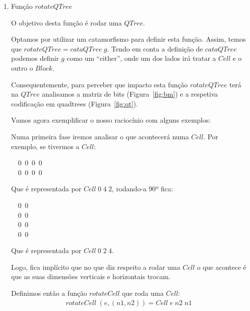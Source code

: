 \documentclass[a4paper]{article}
\newcommand{\Conid}[1]{\mathit{#1}}
\newcommand{\Varid}[1]{\mathit{#1}}
\begin{document}
\begin{enumerate}

\item Função \ensuremath{\Varid{rotateQTree}}

O objetivo desta função é rodar uma \ensuremath{\Conid{QTree}}.

Optamos por utilizar um catamorfismo para definir
esta função. Assim, temos que \ensuremath{\Varid{rotateQTree}\mathrel{=}\Varid{cataQTree}\;\Varid{g}}.
Tendo em conta a definição de \ensuremath{\Varid{cataQTree}} podemos definir \ensuremath{\Varid{g}}
como um ``either'', onde um dos lados irá tratar a \ensuremath{\Conid{Cell}} e o outro
o \ensuremath{\Conid{Block}}.

Consequentemente, para perceber que impacto esta função \ensuremath{\Varid{rotateQTree}}
terá na \ensuremath{\Conid{QTree}} analisamos a matriz de bits (Figura~\ref{fig:bm}) e a
respetiva codificação em quadtrees (Figura~\ref{fig:qt}).

Vamos agora exemplificar o nosso raciocínio com alguns exemplos:

Numa primeira fase iremos analisar o que acontecerá numa \ensuremath{\Conid{Cell}}.
Por exemplo, se tivermos a \ensuremath{\Conid{Cell}}:
\begin{tabbing}\ttfamily
~~0~0~0~0~\\
\ttfamily ~~0~0~0~0~
\end{tabbing}

Que é representada por \ensuremath{\Conid{Cell}\;\mathrm{0}\;\mathrm{4}\;\mathrm{2}}, rodando-a $90º$ fica:
\begin{tabbing}\ttfamily
~~0~0~\\
\ttfamily ~~0~0~\\
\ttfamily ~~0~0~\\
\ttfamily ~~0~0~
\end{tabbing}
Que é representada por \ensuremath{\Conid{Cell}\;\mathrm{0}\;\mathrm{2}\;\mathrm{4}}.

Logo, fica implícito que no que diz respeito a rodar uma \ensuremath{\Conid{Cell}} o que
acontece é que as suas dimensões verticais e horizontais trocam.

Definimos então a função \ensuremath{\Varid{rotateCell}} que roda uma \ensuremath{\Conid{Cell}}:
\begin{eqnarray*}
\ensuremath{\Varid{rotateCell}\;(\Varid{e},(\Varid{n1},\Varid{n2}))\mathrel{=}\Conid{Cell}\;\Varid{e}\;\Varid{n2}\;\Varid{n1}}
\end{eqnarray*}


\end{enumerate}
\end{document}
